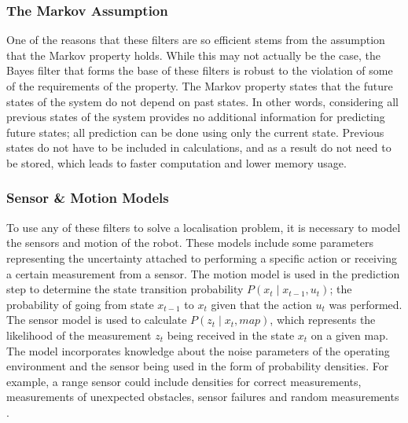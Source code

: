 \documentclass[conference]{IEEEtran}
\begin{document}
\subsubsection{The Markov Assumption}
One of the reasons that these filters are so efficient stems from the assumption that the Markov property holds. While this may not actually be the case, the Bayes filter that forms the base of these filters is robust to the violation of some of the requirements of the property. The Markov property states that the future states of the system do not depend on past states. In other words, considering all previous states of the system provides no additional information for predicting future states; all prediction can be done using only the current state. Previous states do not have to be included in calculations, and as a result do not need to be stored, which leads to faster computation and lower memory usage.

\subsubsection{Sensor \& Motion Models}
To use any of these filters to solve a localisation problem, it is necessary to model the sensors and motion of the robot. These models include some parameters representing the uncertainty attached to performing a specific action or receiving a certain measurement from a sensor. The motion model is used in the prediction step to determine the state transition probability $P(x_t\mid x_{t-1}, u_t)$; the probability of going from state $x_{t-1}$ to $x_t$ given that the action $u_t$ was performed. The sensor model is used to calculate $P(z_t\mid x_t,map)$, which represents the likelihood of the measurement $z_t$ being received in the state $x_t$ on a given map. The model incorporates knowledge about the noise parameters of the operating environment and the sensor being used in the form of probability densities. For example, a range sensor could include densities for correct measurements, measurements of unexpected obstacles, sensor failures and random measurements \cite{thrun}. 
\end{document}
